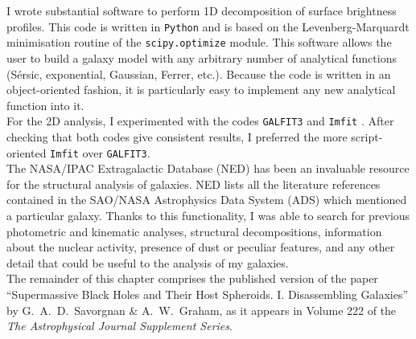 I wrote substantial software to perform 1D decomposition of surface brightness profiles. 
This code is written in {\tt Python} and is based on the Levenberg-Marquardt minimisation routine 
of the {\tt scipy.optimize} module. 
This software allows the user to build a galaxy model with any arbitrary number of analytical functions 
(S\'ersic, exponential, Gaussian, Ferrer, etc.). 
Because the code is written in an object-oriented fashion, 
it is particularly easy to implement any new analytical function into it. \\ 

For the 2D analysis, I experimented with the codes {\tt GALFIT3} \citep{peng2010} 
and {\tt Imfit} \citep{imfit}. 
After checking that both codes give consistent results, 
I preferred the more script-oriented {\tt Imfit} over {\tt GALFIT3}. \\ 

The NASA/IPAC Extragalactic Database (NED) has been an invaluable resource 
for the structural analysis of galaxies. 
NED lists all the literature references contained in the SAO/NASA Astrophysics Data System (ADS) 
which mentioned a particular galaxy. 
Thanks to this functionality, 
I was able to search for previous photometric and kinematic analyses, 
structural decompositions, information about the nuclear activity, 
presence of dust or peculiar features, 
and any other detail that could be useful to the analysis of my galaxies. \\

The remainder of this chapter comprises the published version of the paper 
``Supermassive Black Holes and Their Host Spheroids. I. Disassembling Galaxies'' 
by G.~A.~D.~Savorgnan \& A.~W.~Graham,  
as it appears in Volume 222 of the \emph{The Astrophysical Journal Supplement Series}. 



